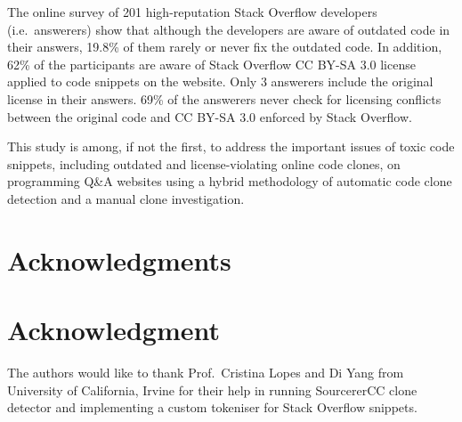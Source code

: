 \documentclass[10pt,journal,compsoc]{IEEEtran}
\begin{document}
The online survey of 201 high-reputation Stack Overflow developers (i.e.~answerers)
show that although the developers are aware of outdated code in their answers,
19.8\% of them rarely or never fix the outdated code. In addition, 62\% of the participants
are aware of Stack Overflow CC BY-SA 3.0 license applied to code snippets on the website.
Only 3 answerers include the original license in their answers. 69\% of the answerers
never check for licensing conflicts between the original code and CC BY-SA 3.0 
enforced by Stack Overflow.

This study is among, if not the first, to address the important issues of toxic
code snippets, including outdated and license-violating online code clones, on
programming Q\&A websites using a hybrid methodology of automatic code clone
detection and a manual clone investigation.


\ifCLASSOPTIONcompsoc
  \section*{Acknowledgments}
\else
  \section*{Acknowledgment}
\fi


The authors would like to thank Prof.~Cristina Lopes and Di Yang
from University of California, Irvine
for their help in running SourcererCC clone detector and implementing
a custom tokeniser for Stack Overflow snippets.



  

% 
\end{document}
